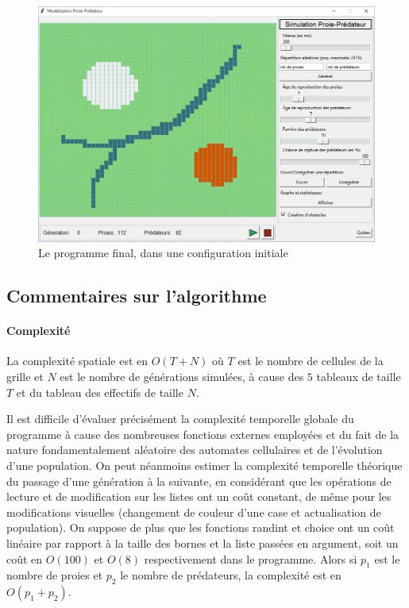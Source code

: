 \documentclass[11pt]{article}
\newcommand{\grandO}[1]{O\mathopen{}\left(#1\right)}
\begin{document}
\begin{figure}[!ht]
    \centering
    \includegraphics[width=15cm]{apercu_programme.png}
    \caption{Le programme final, dans une configuration initiale}
    \label{fig:programme}
\end{figure}

\subsection{Commentaires sur l'algorithme}

\paragraph{Complexité}
La complexité spatiale est en $\grandO{T + N}$ où $T$ est le nombre de cellules de la grille et $N$ est le nombre de générations simulées, à cause des $5$ tableaux de taille $T$ et du tableau des effectifs de taille $N$.

Il est difficile d'évaluer précisément la complexité temporelle globale du programme à cause des nombreuses fonctions externes employées et du fait de la nature fondamentalement aléatoire des automates cellulaires et de l'évolution d'une population. On peut néanmoins estimer la complexité temporelle théorique du passage d'une génération à la suivante, en considérant que les opérations de lecture et de modification sur les listes ont un coût constant, de même pour les modifications visuelles (changement de couleur d'une case et actualisation de population). On suppose de plus que les fonctions \textsf{randint} et \textsf{choice} ont un coût linéaire par rapport à la taille des bornes et la liste passées en argument, soit un coût en $\grandO{100}$ et $\grandO{8}$ respectivement dans le programme. Alors si $p_1$ est le nombre de proies et $p_2$ le nombre de prédateurs, la complexité est en $\grandO{p_1 + p_2}$.
\end{document}
